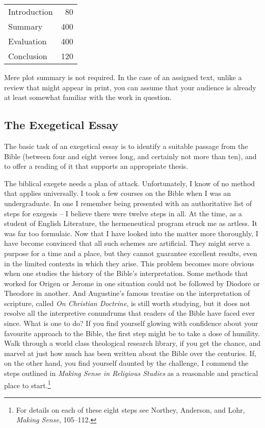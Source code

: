 \documentclass[11pt,twocolumn]{article}
\begin{document}
\begin{table}[htbp]
  \centering
  {\begin{tabular}{lr}
    \toprule
    Introduction & 80  \\
    Summary      & 400 \\
    Evaluation   & 400 \\
    Conclusion   & 120 \\
    \bottomrule
  \end{tabular}}
\end{table}

\noindent Mere plot summary is not required. In the case of an assigned
text, unlike a review that might appear in print, you can assume that
your audience is already at least somewhat familiar with the work in
question.

\subsection{The Exegetical Essay}

The basic task of an exegetical essay is to identify a suitable passage
from the Bible (between four and eight verses long, and certainly not
more than ten), and to offer a reading of it that supports an
appropriate thesis.

The biblical exegete needs a plan of attack. Unfortunately, I know of no
method that applies universally. I took a few courses on the Bible when
I was an undergraduate. In one I remember being presented with an
authoritative list of steps for exegesis – I believe there were twelve
steps in all. At the time, as a student of English Literature, the
hermeneutical program struck me as artless. It was far too formulaic.
Now that I have looked into the matter more thoroughly, I have become
convinced that all such schemes are artificial. They might serve a
purpose for a time and a place, but they cannot guarantee excellent
results, even in the limited contexts in which they arise. This problem
becomes more obvious when one studies the history of the Bible's
interpretation. Some methods that worked for Origen or Jerome in one
situation could not be followed by Diodore or Theodore in another. And
Augustine's famous treatise on the interpretation of scripture, called
\emph{On Christian Doctrine}, is still worth studying, but it does not
resolve all the interpretive conundrums that readers of the Bible have
faced ever since. What is one to do? If you find yourself glowing with
confidence about your favourite approach to the Bible, the first step
might be to take a dose of humility. Walk through a world class
theological research library, if you get the chance, and marvel at just
how much has been written about the Bible over the centuries. If, on the
other hand, you find yourself daunted by the challenge, I commend the
steps outlined in \emph{Making Sense in Religious Studies} as a
reasonable and practical place to start.\footnote{For details on each of
these eight steps see Northey, Anderson, and Lohr, \emph{Making Sense},
105–112.}
\end{document}
